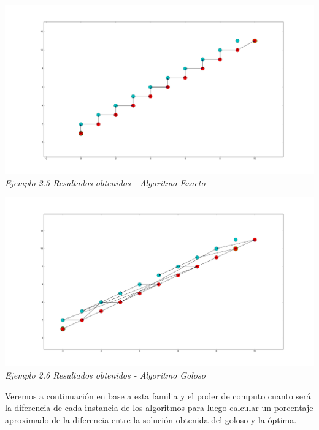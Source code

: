 \vspace*{0.3cm} \vspace*{0.3cm}
  \begin{center}
\includegraphics[scale=0.5]{./EJ2/algunGym0Exacto.png}
\\{\textit{Ejemplo 2.5 Resultados obtenidos - Algoritmo Exacto }}
  \end{center}
  \vspace*{0.3cm}

\vspace*{0.3cm} \vspace*{0.3cm}
  \begin{center}
\includegraphics[scale=0.5]{./EJ2/algunGym0Goloso.png}
\\{\textit{Ejemplo 2.6 Resultados obtenidos - Algoritmo Goloso }}
  \end{center}
  \vspace*{0.3cm}

Veremos a continuaci\'on en base a esta familia y el poder de computo cuanto ser\'a la diferencia de cada instancia de los algoritmos para luego calcular un porcentaje aproximado de la diferencia entre la soluci\'on obtenida del goloso y la \'optima.

